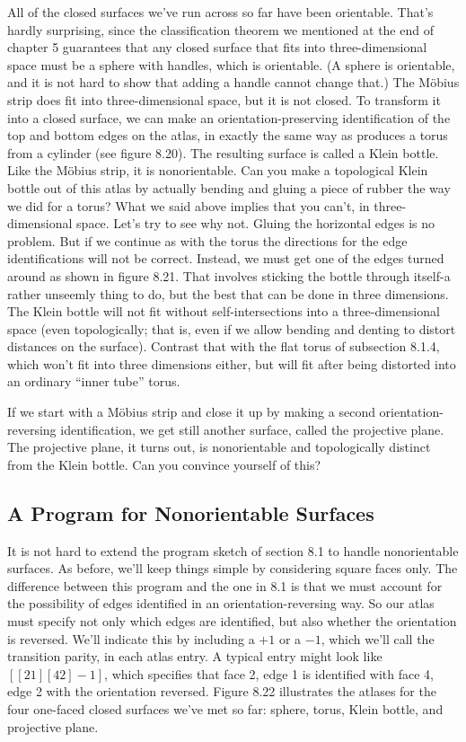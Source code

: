 \documentclass{book}
\begin{document}
All of the closed surfaces we've run across so far have been orientable.
That's hardly surprising, since the classification theorem we mentioned
at the end of chapter 5 guarantees that any closed surface that fits
into three-dimensional space must be a sphere with handles, which is
orientable. (A sphere is orientable, and it is not hard to show that
adding a handle cannot change that.) The M\"obius strip does fit into
three-dimensional space, but it is not closed. To transform it into a
closed surface, we can make an orientation-preserving identification of
the top and bottom edges on the atlas, in exactly the same way as
produces a torus from a cylinder (see figure 8.20). The resulting surface
is called a Klein bottle. Like the M\"obius strip, it is nonorientable.
Can you make a topological Klein bottle out of this atlas by actually
bending and gluing a piece of rubber the way we did for a torus? What
we said above implies that you can't, in three-dimensional space. Let's
try to see why not. Gluing the horizontal edges is no problem. But if we
continue as with the torus the directions for the edge identifications will
not be correct. Instead, we must get one of the edges turned around as
shown in figure 8.21. That involves sticking the bottle through itself-a
rather unseemly thing to do, but the best that can be done in three
dimensions. The Klein bottle will not fit without self-intersections into
a three-dimensional space (even topologically; that is, even if we allow
bending and denting to distort distances on the surface). Contrast that
with the flat torus of subsection 8.1.4, which won't fit into three dimensions either, but will fit after being distorted into an ordinary ``inner tube'' torus.

If we start with a M\"obius strip and close it up by making a second
orientation-reversing identification, we get still another surface, called
the projective plane. The projective plane, it turns out, is nonorientable
and topologically distinct from the Klein bottle. Can you convince
yourself of this?

\subsection{A Program for Nonorientable Surfaces}

It is not hard to extend the program sketch of section 8.1 to handle
nonorientable surfaces. As before, we'll keep things simple by considering square faces only. The difference between this program and the one
in 8.1 is that we must account for the possibility of edges identified
in an orientation-reversing way. So our atlas must specify not only
which edges are identified, but also whether the orientation is reversed.
We'll indicate this by including a $+1$ or a $-1$, which we'll call the
transition parity, in each atlas entry. A typical entry might look like
$[[2 1] [4 2] -1]$, which specifies that face 2, edge 1 is identified with
face 4, edge 2 with the orientation reversed. Figure 8.22 illustrates the
atlases for the four one-faced closed surfaces we've met so far: sphere,
torus, Klein bottle, and projective plane.
\end{document}
